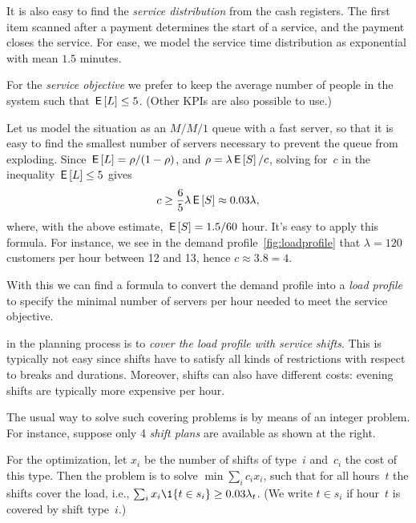 \documentclass[stochastic-or.tex]{subfiles}
\begin{document}
It is also easy to find the\emph{ service distribution} from the cash registers.
The first item scanned after a payment determines the start of a service, and the payment closes the service. For ease, we model the service time distribution as exponential with mean $1.5$ minutes.

For the \emph{service objective} we prefer to keep the average number of people in the system such that $\,\mathsf{E}\left[L\right] \leq 5$. (Other KPIs are also possible to use.)

Let us model the situation as an $M/M/1$ queue with a fast server, so that it is easy to find the smallest number of servers necessary to prevent the queue from exploding.
Since $\,\mathsf{E}\left[L\right] = \rho/(1-\rho)$, and $\rho=\lambda \,\mathsf{E}\left[S\right] /c$, solving for~$c$ in the inequality $\,\mathsf{E}\left[L\right] \leq 5$ gives
\begin{equation*}
c \geq \frac 6 5 \lambda \,\mathsf{E}\left[S\right] \approx 0.03 \lambda,
\end{equation*}
where, with  the above estimate, $\,\mathsf{E}\left[S\right]=1.5/60$ hour.
It's easy to apply this formula. For instance,  we see in the demand profile~\cref{fig:loadprofile} that $\lambda= 120$ customers per hour between 12 and 13, hence $c\approx 3.8 = 4$.

With this we can find a formula to convert the demand profile into a \emph{load profile} to specify the minimal number of servers per hour needed to meet the service objective.


 in the planning process is to \emph{cover the load profile with service shifts}.
This is typically not easy since shifts have to satisfy all kinds of restrictions with respect to breaks and durations.  Moreover, shifts can also have different costs: evening shifts are typically  more expensive per hour.

The usual way to solve such covering problems is by means of an integer
problem. For instance, suppose only 4 \emph{shift plans} are available as shown at the right.

For the optimization, let $x_i$ be the number of shifts of type~$i$ and~$c_i$ the cost of this type.
Then the problem is to solve $\min \sum_i c_i x_i$,
such that for all hours~$t$ the shifts cover the load, i.e., $\sum_i x_i \1{t \in s_i} \geq 0.03 \lambda_t$.
(We write $t\in s_i$ if hour~$t$ is covered by shift type~$i$.)
\end{document}
